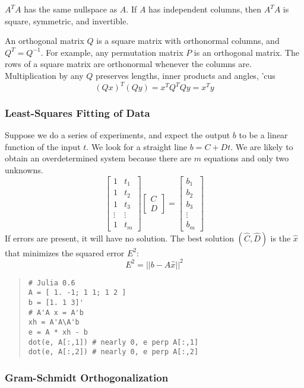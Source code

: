  $A^TA$ has the same nullspace as $A$. If $A$ has independent columns,
 then $A^TA$ is square, symmetric, and invertible.

 An orthogonal matrix $Q$ is a square matrix with orthonormal columns, and $Q^T=Q^{-1}$.
 For example, any permutation matrix $P$ is an orthogonal matrix.
 The rows of a square matrix are orthonormal whenever the columns are.
 Multiplication by any $Q$ preserves lengths, inner products and angles, 'cus
 $$(Qx)^T(Qy) = x^TQ^TQy = x^Ty$$

 \subsubsection{Least-Squares Fitting of Data}

 Suppose we do a series of experiments, and expect the output $b$ to be a
 linear function of the input $t$. We look for a straight line $b = C+Dt$.
 We are likely to obtain an overdetermined system because there are $m$
 equations and only two unknowns.
 $$\begin{bmatrix} 1 & t_1 \\ 1 & t_2 \\ 1 & t_3 \\ \vdots & \vdots \\ 1 & t_m \end{bmatrix}
	 \begin{bmatrix} C \\ D \end{bmatrix} = \begin{bmatrix} b_1 \\ b_2 \\ b_3 \\ \vdots \\ b_m \end{bmatrix}$$
 If errors are present, it will have no solution. The best solution $(\hat{C},\hat{D})$
 is the $\hat{x}$ that minimizes the squared error $E^2$:
 $$E^2 = ||b-A\hat{x}||^2$$

 \begin{quote}\begin{lstlisting}
# Julia 0.6
A = [ 1. -1; 1 1; 1 2 ]
b = [1. 1 3]'
# A'A x = A'b
xh = A'A\A'b
e = A * xh - b
dot(e, A[:,1]) # nearly 0, e perp A[:,1]
dot(e, A[:,2]) # nearly 0, e perp A[:,2]
 \end{lstlisting}\end{quote}


 \subsubsection{Gram-Schmidt Orthogonalization}

